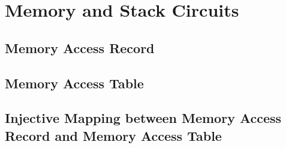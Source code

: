 \section{Memory and Stack Circuits}
\label{chp:mem-stack-circuits}
\subsection{Memory Access Record}
\subsection{Memory Access Table}
\subsection{Injective Mapping between Memory Access Record and Memory Access Table} 